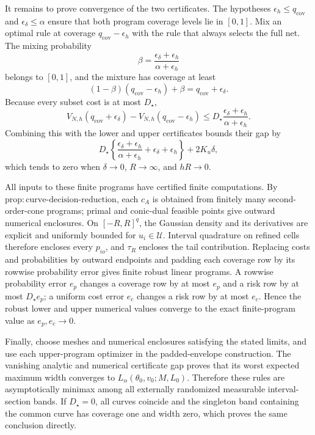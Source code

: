 It remains to prove convergence of the two certificates.  The hypotheses
\(\epsilon_h\le q_{\mathrm{cov}}\) and \(\epsilon_\delta\le\alpha\) ensure that both program coverage levels lie in \([0,1]\).  Mix an optimal rule at coverage \(q_{\mathrm{cov}}-\epsilon_h\) with the rule that always selects the full net.  The mixing probability
\[
\beta=
\frac{\epsilon_\delta+\epsilon_h}{\alpha+\epsilon_h}
\]
belongs to \([0,1]\), and the mixture has coverage at least
\[
(1-\beta)(q_{\mathrm{cov}}-\epsilon_h)+\beta
=q_{\mathrm{cov}}+\epsilon_\delta.
\]
Because every subset cost is at most \(D_\star\),
\[
V_{N,h}(q_{\mathrm{cov}}+\epsilon_\delta)
-V_{N,h}(q_{\mathrm{cov}}-\epsilon_h)
\le
D_\star\frac{\epsilon_\delta+\epsilon_h}{\alpha+\epsilon_h}.
\]
Combining this with the lower and upper certificates bounds their gap by
\[
D_\star\left\{
\frac{\epsilon_\delta+\epsilon_h}{\alpha+\epsilon_h}
+\epsilon_\delta+\epsilon_h
\right\}
+2K_u\delta,
\]
which tends to zero when \(\delta\to0\), \(R\to\infty\), and \(hR\to0\).

All inputs to these finite programs have certified finite computations.  By
\(\mathrm{prop:curve\mbox{-}decision\mbox{-}reduction}\), each \(c_A\) is obtained from finitely many second-order-cone programs; primal and conic-dual feasible points give outward numerical enclosures.  On \([-R,R]^q\), the Gaussian density and its derivatives are explicit and uniformly bounded for \(u_i\in\mathcal U\).  Interval quadrature on refined cells therefore encloses every \(p_{io}\), and \(\tau_R\) encloses the tail contribution.  Replacing costs and probabilities by outward endpoints and padding each coverage row by its rowwise probability error gives finite robust linear programs.  A rowwise probability error \(e_p\) changes a coverage row by at most \(e_p\) and a risk row by at most \(D_\star e_p\); a uniform cost error \(e_c\) changes a risk row by at most \(e_c\).  Hence the robust lower and upper numerical values converge to the exact finite-program value as \(e_p,e_c\to0\).

Finally, choose meshes and numerical enclosures satisfying the stated limits, and use each upper-program optimizer in the padded-envelope construction.  The vanishing analytic and numerical certificate gap proves that its worst expected maximum width converges to
\(L_\alpha(\theta_0,v_0;M,L_0)\).  Therefore these rules are asymptotically minimax among all externally randomized measurable interval-section bands.  If \(D_\star=0\), all curves coincide and the singleton band containing the common curve has coverage one and width zero, which proves the same conclusion directly.

